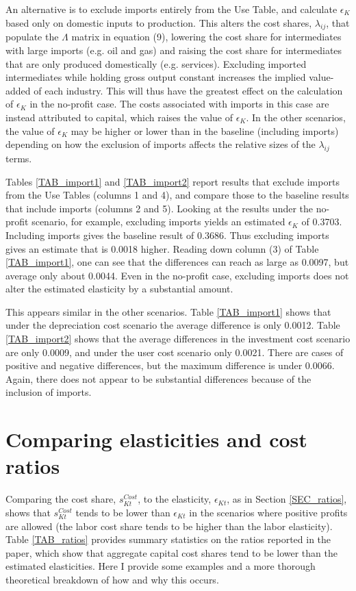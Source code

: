 \documentclass[11pt]{article}
\begin{document}
An alternative is to exclude imports entirely from the Use Table, and calculate $\epsilon_K$ based only on domestic inputs to production. This alters the cost shares, $\lambda_{ij}$, that populate the $\Lambda$ matrix in equation (9), lowering the cost share for intermediates with large imports (e.g. oil and gas) and raising the cost share for intermediates that are only produced domestically (e.g. services). Excluding imported intermediates while holding gross output constant increases the implied value-added of each industry. This will thus have the greatest effect on the calculation of $\epsilon_K$ in the no-profit case. The costs associated with imports in this case are instead attributed to capital, which raises the value of $\epsilon_K$. In the other scenarios, the value of $\epsilon_K$ may be higher or lower than in the baseline (including imports) depending on how the exclusion of imports affects the relative sizes of the $\lambda_{ij}$ terms. 

Tables \ref{TAB_import1} and \ref{TAB_import2} report results that exclude imports from the Use Tables (columns 1 and 4), and compare those to the baseline results that include imports (columns 2 and 5). Looking at the results under the no-profit scenario, for example, excluding imports yields an estimated $\epsilon_K$ of 0.3703. Including imports gives the baseline result of 0.3686. Thus excluding imports gives an estimate that is 0.0018 higher. Reading down column (3) of Table \ref{TAB_import1}, one can see that the differences can reach as large as 0.0097, but average only about 0.0044. Even in the no-profit case, excluding imports does not alter the estimated elasticity by a substantial amount.

This appears similar in the other scenarios. Table \ref{TAB_import1} shows that under the depreciation cost scenario the average difference is only 0.0012. Table \ref{TAB_import2} shows that the average differences in the investment cost scenario are only 0.0009, and under the user cost scenario only 0.0021. There are cases of positive and negative differences, but the maximum difference is under 0.0066. Again, there does not appear to be substantial differences because of the inclusion of imports.

\section{Comparing elasticities and cost ratios}\label{SEC_elasticity_theory}
Comparing the cost share, $s_{Kt}^{Cost}$, to the elasticity, $\epsilon_{Kt}$, as in Section \ref{SEC_ratios}, shows that $s_{Kt}^{Cost}$ tends to be lower than $\epsilon_{Kt}$ in the scenarios where positive profits are allowed (the labor cost share tends to be higher than the labor elasticity). Table \ref{TAB_ratios} provides summary statistics on the ratios reported in the paper, which show that aggregate capital cost shares tend to be lower than the estimated elasticities. Here I provide some examples and a more thorough theoretical breakdown of how and why this occurs. 
\end{document}

